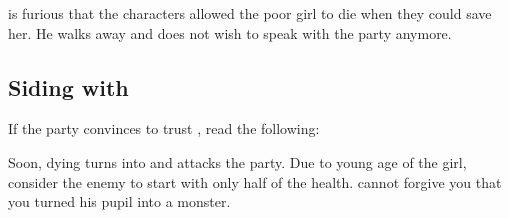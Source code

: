 \npcMedic{} is furious that the characters allowed the poor girl to die when they could save her. He walks away and does not wish to speak with the party anymore.

\newpage
\subsection{Siding with \npcMedic{}}

If the party convinces \npcBabsk{} to trust \npcMedic{}, read the following:


Soon, dying \npcSickGirl{} turns into \enemyReanimatedPerson{} and attacks the party. Due to young age of the girl, consider the enemy to start with only half of the health. \npcBabsk{} cannot forgive you that you turned his pupil into a monster.
